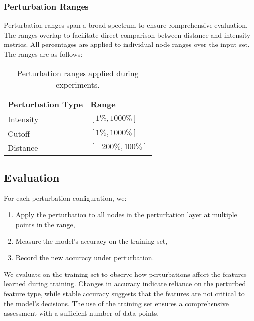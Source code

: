 \subsubsection{Perturbation Ranges}

Perturbation ranges span a broad spectrum to ensure comprehensive evaluation. The ranges overlap to facilitate direct comparison between distance and intensity metrics. All percentages are applied to individual node ranges over the input set. The ranges are as follows:

\begin{table}[h]
\centering
\begin{tabular}{ll}
\hline
\textbf{Perturbation Type} & \textbf{Range} \\
\hline
Intensity & $[1\%, 1000\%]$ \\
Cutoff & $[1\%, 1000\%]$ \\
Distance & $[-200\%, 100\%]$ \\
\hline
\end{tabular}
\caption{Perturbation ranges applied during experiments.}
\end{table}

\subsection{Evaluation}

For each perturbation configuration, we:
\begin{enumerate}
    \item Apply the perturbation to all nodes in the perturbation layer at multiple points in the range,
    \item Measure the model's accuracy on the training set,
    \item Record the new accuracy under perturbation.
\end{enumerate}

We evaluate on the training set to observe how perturbations affect the features learned during training. Changes in accuracy indicate reliance on the perturbed feature type, while stable accuracy suggests that the features are not critical to the model's decisions. The use of the training set ensures a comprehensive assessment with a sufficient number of data points.

